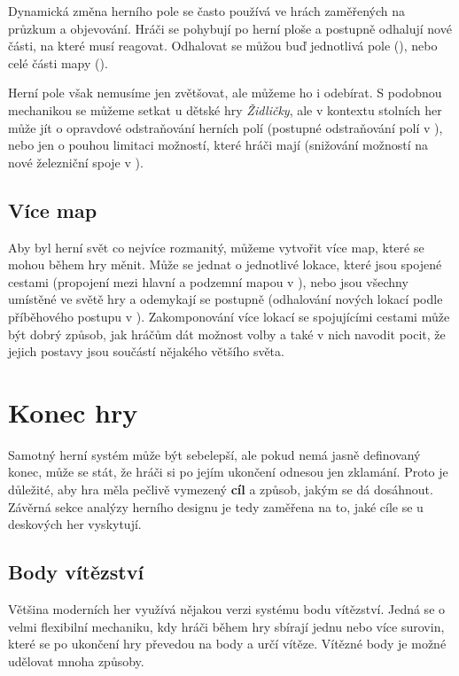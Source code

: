 Dynamická změna herního pole se často používá ve hrách zaměřených na průzkum a objevování. Hráči se pohybují po herní ploše a postupně odhalují nové části, na které musí reagovat. Odhalovat se můžou buď jednotlivá pole (), nebo celé části mapy ().

Herní pole však nemusíme jen zvětšovat, ale můžeme ho i odebírat. S podobnou mechanikou se můžeme setkat u dětské hry \textit{Židličky}, ale v kontextu stolních her může jít o opravdové odstraňování herních polí (postupné odstraňování polí v ), nebo jen o pouhou limitaci možností, které hráči mají (snižování možností na nové železniční spoje v ).

\subsection{Více map}
\label{subsec:movement_multiple_maps}

Aby byl herní svět co nejvíce rozmanitý, můžeme vytvořit více map, které se mohou během hry měnit. Může se jednat o jednotlivé lokace, které jsou spojené cestami (propojení mezi hlavní a podzemní mapou v ), nebo jsou všechny umístěné ve světě hry a odemykají se postupně (odhalování nových lokací podle příběhového postupu v ). Zakomponování více lokací se spojujícími cestami může být dobrý způsob, jak hráčům dát možnost volby a také v nich navodit pocit, že jejich postavy jsou součástí nějakého většího světa.



\section{Konec hry}
\label{sec:end}

Samotný herní systém může být sebelepší, ale pokud nemá jasně definovaný konec, může se stát, že hráči si po jejím ukončení odnesou jen zklamání. Proto je důležité, aby hra měla pečlivě vymezený \textbf{cíl} a způsob, jakým se dá dosáhnout. Závěrná sekce analýzy herního designu je tedy zaměřena na to, jaké cíle se u deskových her vyskytují.

\subsection{Body vítězství}
\label{subsec:end_victory_points}

Většina moderních her využívá nějakou verzi systému bodu vítězství. Jedná se o velmi flexibilní mechaniku, kdy hráči během hry sbírají jednu nebo více surovin, které se po ukončení hry převedou na body a určí vítěze. Vítězné body je možné udělovat mnoha způsoby.

